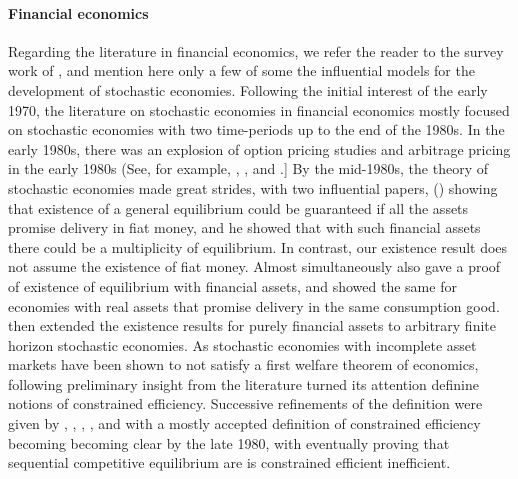 \paragraph{Financial economics}
Regarding the literature in financial economics, we refer the reader to the survey work of \citet{magill2002theory}, and mention here only a few of some the influential models for the development of stochastic economies. Following the initial interest of the early 1970, the literature on stochastic economies in financial economics mostly focused on stochastic economies with two time-periods up to the end of the 1980s. In the early 1980s, there was an explosion of option pricing studies and arbitrage pricing in the early 1980s (See, for
example, \citet{cox1976valuation, ross1976options}  \citet{cox1979option}, \citet{cox1985intertemporal}, and \citet{huberman1982simple}.] 
By the mid-1980s, the theory of stochastic economies made great strides, with two influential papers, \citeauthor{cass1984competitive} (\citeyear{cass1984competitive, cass1985number}) showing that existence of a general equilibrium could be guaranteed if all the assets promise delivery
in fiat money, and he showed that with such financial assets there could be a multiplicity of equilibrium. In contrast, our existence result does not assume the existence of fiat money. Almost simultaneously \citet{werner1985equilibrium} also gave a proof of existence of equilibrium with financial assets, and \citet{geanakoplos1986walrasian} showed the same for economies with real assets that promise delivery in the same consumption good.\citet{duffie1987stochastic} then extended the existence results for purely financial assets to arbitrary finite horizon stochastic economies. As stochastic economies with incomplete asset markets have been shown to not satisfy a first welfare theorem of economics, following preliminary insight from \citet{diamond1967incompletege} the literature turned its attention definine notions of constrained efficiency. Successive refinements of the definition were given by \citet{diamond1980income}, \citet{loong1982pecuniary}, \citet{newbery1982theory}, \citet{stiglitz1982self}, and \citet{greenwald1986externalities} with a mostly accepted definition of constrained efficiency becoming becoming clear by the late 1980, with \citet{geanakoplos1990introduction} eventually proving that sequential competitive equilibrium are is constrained efficient inefficient.
 



